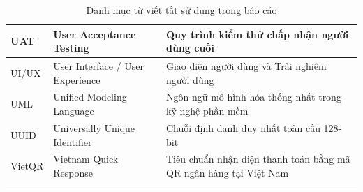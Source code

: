 \begin{longtable}{|p{2.8cm}|p{5.5cm}|p{6.7cm}|}
UAT & User Acceptance Testing & Quy trình kiểm thử chấp nhận người dùng cuối \\ \hline
UI/UX & User Interface / User Experience & Giao diện người dùng và Trải nghiệm người dùng \\ \hline
UML & Unified Modeling Language & Ngôn ngữ mô hình hóa thống nhất trong kỹ nghệ phần mềm \\ \hline
UUID & Universally Unique Identifier & Chuỗi định danh duy nhất toàn cầu 128-bit \\ \hline
VietQR & Vietnam Quick Response & Tiêu chuẩn nhận diện thanh toán bằng mã QR ngân hàng tại Việt Nam \\ \hline
\caption{Danh mục từ viết tắt sử dụng trong báo cáo}
\label{tab:viettat}
\end{longtable}
